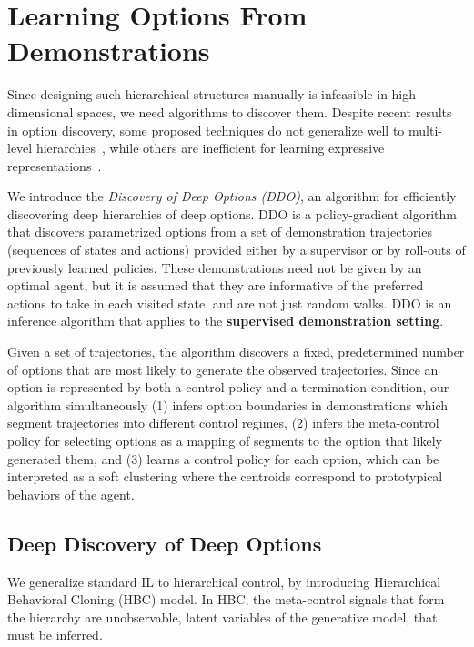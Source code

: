 \section{Learning Options From Demonstrations}
Since designing such hierarchical structures manually is infeasible in high-dimensional spaces, we need algorithms to discover them. Despite recent results in option discovery, some proposed techniques do not generalize well to multi-level hierarchies~\cite{kulkarni2016hierarchical, heess2016learning, baconHP16}, while others are inefficient for learning expressive representations~\cite{daniel2012hierarchical,lakshminarayananKKR16,hamidiTGF15,buiVW02}.

We introduce the \emph{Discovery of Deep Options (DDO)}, an algorithm for efficiently discovering deep hierarchies of deep options. DDO is a policy-gradient algorithm that discovers parametrized options from a set of demonstration trajectories (sequences of states and actions) provided either by a supervisor or by roll-outs of previously learned policies. These demonstrations need not be given by an optimal agent, but it is assumed that they are informative of the preferred actions to take in each visited state, and are not just random walks. DDO is an inference algorithm that applies to the \textbf{supervised demonstration setting}.

Given a set of trajectories, the algorithm discovers a fixed, predetermined number of options that are most likely to generate the observed trajectories. Since an option is represented by both a control policy and a termination condition, our algorithm simultaneously (1) infers option boundaries in demonstrations which segment trajectories into different control regimes, (2) infers the meta-control policy for selecting options as a mapping of segments to the option that likely generated them, and (3) learns a control policy for each option, which can be interpreted as a soft clustering where the centroids correspond to prototypical behaviors of the agent.

\subsection{Deep Discovery of Deep Options}
We generalize standard IL to hierarchical control, by introducing Hierarchical Behavioral Cloning (HBC) model. In HBC, the meta-control signals that form the hierarchy are unobservable, latent variables of the generative model, that must be inferred.

